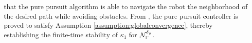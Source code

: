 %
%
%
 that the pure pursuit algorithm is able to navigate the robot  the neighborhood of the desired path  while avoiding obstacles. 
%
From \cite{ollero1995stability}, the pure pursuit controller is proved to satisfy Assumption \ref{assumption:globalconvergence}, thereby establishing the finite-time stability of $\kappa_1$ for $\mathcal{N}_\Gamma^{\delta_{y}}$. 


